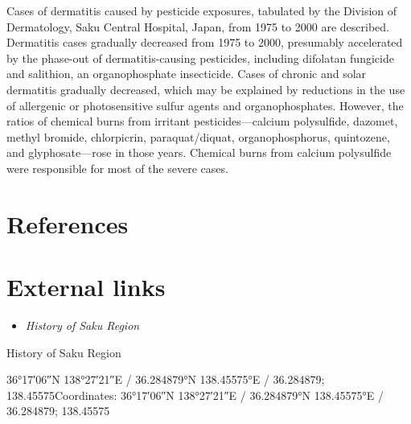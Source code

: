 Cases of dermatitis caused by pesticide exposures, tabulated by the
Division of Dermatology, Saku Central Hospital, Japan, from 1975 to 2000
are described. Dermatitis cases gradually decreased from 1975 to 2000,
presumably accelerated by the phase-out of dermatitis-causing
pesticides, including difolatan fungicide and salithion, an
organophosphate insecticide. Cases of chronic and solar dermatitis
gradually decreased, which may be explained by reductions in the use of
allergenic or photosensitive sulfur agents and organophosphates.
However, the ratios of chemical burns from irritant pesticides---calcium
polysulfide, dazomet, methyl bromide, chlorpicrin, paraquat/diquat,
organophosphorus, quintozene, and glyphosate---rose in those years.
Chemical burns from calcium polysulfide were responsible for most of the
severe cases.

\section{References}\label{references}

\section{External links}\label{external-links}

\begin{itemize}
\item
  \emph{History of Saku Region}
\end{itemize}

History of Saku Region

36°17′06″N 138°27′21″E﻿ / ﻿36.284879°N 138.45575°E﻿ / 36.284879;
138.45575Coordinates: 36°17′06″N 138°27′21″E﻿ / ﻿36.284879°N
138.45575°E﻿ / 36.284879; 138.45575
